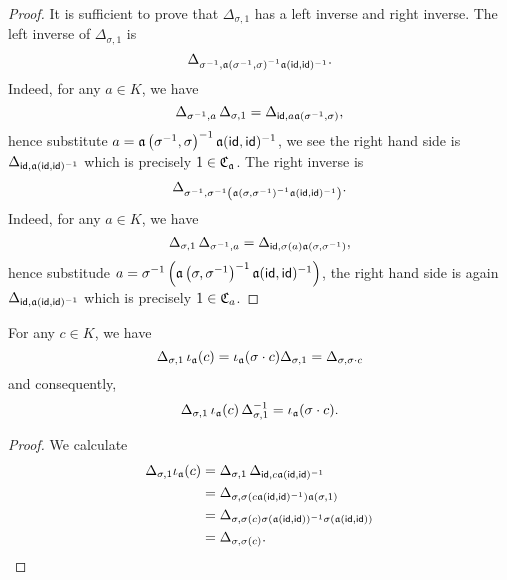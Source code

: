  \begin{proof}
   It is sufficient to prove that $\Delta_{\sigma, 1}$ has a left inverse and right inverse.
   The left inverse of $\Delta_{\sigma, 1}$ is
   \[
     \Delta_{\sigma^{-1}, \mathfrak{a}\left(\sigma^{-1},\sigma\right)^{-1}\mathfrak{a}(\mathsf{id},\mathsf{id})^{-1}}.
   \]
   Indeed, for any $a \in K$, we have
   \[
     \Delta_{\sigma^{-1}, a}\,\Delta_{\sigma, 1} = \Delta_{\mathsf{id}, a\mathfrak{a}\left(\sigma^{-1},\sigma\right)},
   \]
   hence substitute $a = \mathfrak{a}\left(\sigma^{-1},\sigma\right)^{-1}\mathfrak{a}(\mathsf{id},\mathsf{id})^{-1}$, we see the right hand side is $\Delta_{
     \mathsf{id},\mathfrak{a}(\mathsf{id},\mathsf{id})^{-1}}$ which is precisely $1 \in \operatorname{\mathfrak{C}}_{\mathfrak{a}}$. The right inverse is
   \[
     \Delta_{\sigma^{-1}, \sigma^{-1}\left(\mathfrak{a}\left(\sigma,\sigma^{-1}\right)^{-1} \mathfrak{a}(\mathsf{id},\mathsf{id})^{-1}\right)}.
   \]
   Indeed, for any $a \in K$, we have
   \[
     \Delta_{\sigma,1}\,\Delta_{\sigma^{-1},a} = \Delta_{\mathsf{id}, \sigma(a)\mathfrak{a}\left(\sigma,\sigma^{-1}\right)},
   \]
   hence substitude $a = \sigma^{-1}\left(\mathfrak{a}\left(\sigma,\sigma^{-1}\right)^{-1}\mathfrak{a}(\mathsf{id},\mathsf{id})^{-1}\right)$, the right hand side is again $\Delta_{\mathsf{id},\mathfrak{a}(\mathsf{id},\mathsf{id})^{-1}}$ which is precisely $1 \in \operatorname{\mathfrak{C}}_{a}$.
 \end{proof}
 \begin{lemma}\label{lem:cross-product-basis-conj}
   For any $c \in K$, we have
   \[
     \Delta_{\sigma,1}\,\iota_{\mathfrak{a}}(c) = \iota_{\mathfrak{a}}(\sigma\cdot c)\Delta_{\sigma, 1} = \Delta_{\sigma,\sigma\cdot c}
   \]
   and consequently,
   \[
     \Delta_{\sigma,1}\,\iota_{\mathfrak{a}}(c)\,\Delta_{\sigma, 1}^{-1} = \iota_{\mathfrak{a}}(\sigma \cdot c).
   \]
   \leanok
 \end{lemma}

 \begin{proof}
   We calculate
   \[
     \begin{aligned}
       \Delta_{\sigma,1}\iota_{\mathfrak{a}}(c)
       &= \Delta_{\sigma,1}\,\Delta_{\mathsf{id},c\mathfrak{a}(\mathsf{id},\mathsf{id})^{-1}}\\
       &= \Delta_{\sigma, \sigma(c\mathfrak{a}(\mathsf{id},\mathsf{id})^{-1})\mathfrak{a}(\sigma,1)}\\
       &= \Delta_{\sigma,\sigma(c)\sigma(\mathfrak{a}(\mathsf{id},\mathsf{id}))^{-1}\sigma(\mathfrak{a}(\mathsf{id},\mathsf{id}))}\\
       &= \Delta_{\sigma,\sigma(c)}.
     \end{aligned}
   \]
 \end{proof}


